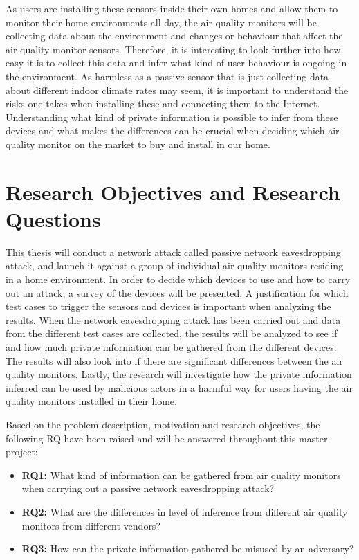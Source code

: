 As users are installing these sensors inside their own homes and allow them to monitor their home environments all day, the air quality monitors will be collecting data about the environment and changes or behaviour that affect the air quality monitor sensors. Therefore, it is interesting to look further into how easy it is to collect this data and infer what kind of user behaviour is ongoing in the environment. As harmless as a passive sensor that is just collecting data about different indoor climate rates may seem, it is important to understand the risks one takes when installing these and connecting them to the Internet. Understanding what kind of private information is possible to infer from these devices and what makes the differences can be crucial when deciding which air quality monitor on the market to buy and install in our home.

\section{Research Objectives and Research Questions}
This thesis will conduct a network attack called passive network eavesdropping attack, and launch it against a group of individual air quality monitors residing in a home environment. In order to decide which devices to use and how to carry out an attack, a survey of the devices will be presented. A justification for which test cases to trigger the sensors and devices is important when analyzing the results. When the network eavesdropping attack has been carried out and data  from the different test cases are collected, the results will be analyzed to see if and how much private information can be gathered from the different devices. The results will also look into if there are significant differences between the air quality monitors. Lastly, the research will investigate how the private information inferred can be used by malicious actors in a harmful way for users having the air quality monitors installed in their home.

Based on the problem description, motivation and research objectives, the following \gls{RQ} have been raised and will be answered throughout this master project:
\begin{itemize}
    \item 
    \textbf{\gls{RQ}1:} What kind of information can be gathered from air quality monitors when carrying out a passive network eavesdropping attack?\\
    \item 
    \textbf{\gls{RQ}2:} What are the differences in level of inference from different air quality monitors from different vendors?\\
    \item 
    \textbf{\gls{RQ}3:} How can the private information gathered be misused by an adversary?\\
\end{itemize}

